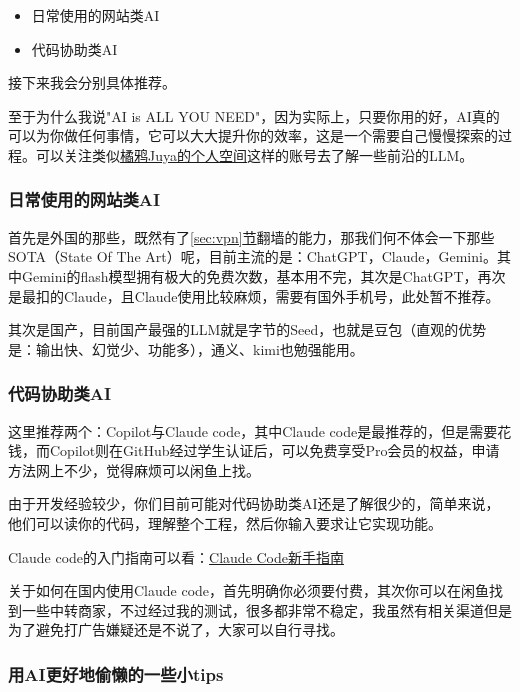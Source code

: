\documentclass[a4paper,12pt]{article}
\begin{document}
\begin{itemize}
    \item 日常使用的网站类AI
    \item 代码协助类AI
\end{itemize}

接下来我会分别具体推荐。

至于为什么我说"AI is ALL YOU NEED"，因为实际上，只要你用的好，AI真的可以为你做任何事情，它可以大大提升你的效率，这是一个需要自己慢慢探索的过程。可以关注类似\href{https://space.bilibili.com/285286947}{橘鸦Juya的个人空间}这样的账号去了解一些前沿的LLM。

\subsubsection{日常使用的网站类AI}

首先是外国的那些，既然有了\hyperref[sec:vpn]{\ref*{sec:vpn}节}翻墙的能力，那我们何不体会一下那些SOTA（State Of The Art）呢，目前主流的是：ChatGPT，Claude，Gemini。其中Gemini的flash模型拥有极大的免费次数，基本用不完，其次是ChatGPT，再次是最扣的Claude，且Claude使用比较麻烦，需要有国外手机号，此处暂不推荐。

其次是国产，目前国产最强的LLM就是字节的Seed，也就是豆包（直观的优势是：输出快、幻觉少、功能多），通义、kimi也勉强能用。

\subsubsection{代码协助类AI}
\label{sec:ai-code-assistant}

这里推荐两个：Copilot与Claude code，其中Claude code是最推荐的，但是需要花钱，而Copilot则在GitHub经过学生认证后，可以免费享受Pro会员的权益，申请方法网上不少，觉得麻烦可以闲鱼上找。

由于开发经验较少，你们目前可能对代码协助类AI还是了解很少的，简单来说，他们可以读你的代码，理解整个工程，然后你输入要求让它实现功能。

Claude code的入门指南可以看：\href{https://www.bilibili.com/list/watchlater?oid=114805046314360\&bvid=BV1kv3ez2E2B}{Claude Code新手指南}

关于如何在国内使用Claude code，首先明确你必须要付费，其次你可以在闲鱼找到一些中转商家，不过经过我的测试，很多都非常不稳定，我虽然有相关渠道但是为了避免打广告嫌疑还是不说了，大家可以自行寻找。

\subsubsection{用AI更好地偷懒的一些小tips}
\end{document}
